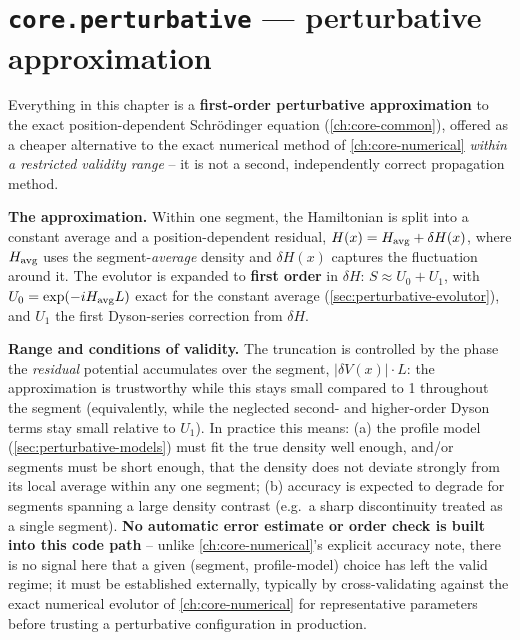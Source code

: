 \chapter{\texttt{core.perturbative} --- perturbative approximation}
\label{ch:core-perturbative}

\begin{notebox}[title={This Chapter Describes an Approximation}]
Everything in this chapter is a \textbf{first-order perturbative
approximation} to the exact position-dependent Schr\"odinger equation
(\cref{ch:core-common}), offered as a cheaper alternative to the exact
numerical method of \cref{ch:core-numerical} \emph{within a restricted
validity range} -- it is not a second, independently correct propagation
method.

\textbf{The approximation.} Within one segment, the Hamiltonian is split
into a constant average and a position-dependent residual,
$H(x)=H_{\rm avg}+\delta H(x)$, where $H_{\rm avg}$ uses the
segment-\emph{average} density and $\delta H(x)$ captures the fluctuation
around it. The evolutor is expanded to \textbf{first order} in $\delta H$:
$S\approx U_0+U_1$, with $U_0=\exp(-iH_{\rm avg}L)$ exact for the constant
average (\cref{sec:perturbative-evolutor}), and $U_1$ the first Dyson-series
correction from $\delta H$.

\textbf{Range and conditions of validity.} The truncation is controlled by
the phase the \emph{residual} potential accumulates over the segment,
$|\delta V(x)|\cdot L$: the approximation is trustworthy while this stays
small compared to 1 throughout the segment (equivalently, while the
neglected second- and higher-order Dyson terms stay small relative to
$U_1$). In practice this means: (a) the profile model
(\cref{sec:perturbative-models}) must fit the true density well enough,
and/or segments must be short enough, that the density does not deviate
strongly from its local average within any one segment; (b) accuracy is
expected to degrade for segments spanning a large density contrast (e.g.\ a
sharp discontinuity treated as a single segment). \textbf{No automatic
error estimate or order check is built into this code path} -- unlike
\cref{ch:core-numerical}'s explicit accuracy note, there is no signal here
that a given (segment, profile-model) choice has left the valid regime; it
must be established externally, typically by cross-validating against the
exact numerical evolutor of \cref{ch:core-numerical} for representative
parameters before trusting a perturbative configuration in production.
\end{notebox}

